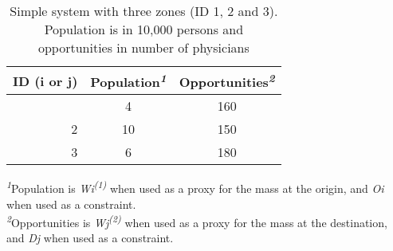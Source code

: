 \begin{table}[!t]
\caption{Simple system with three zones (ID 1, 2 and 3). Population is in 10,000 persons and opportunities in number of physicians} \label{tab:chp2_small_system_land_use_tab}
\fontsize{7.5pt}{9.0pt}\selectfont
\begin{tabular*}{\linewidth}{@{\extracolsep{\fill}}rcc}
\toprule
ID (i or j) & Population\textsuperscript{\textit{1}} & Opportunities\textsuperscript{\textit{2}} \\ 
\midrule\addlinespace[2.5pt]
1 & 4 & 160 \\ 
2 & 10 & 150 \\ 
3 & 6 & 180 \\ 
\bottomrule
\end{tabular*}
\begin{minipage}{\linewidth}
\textsuperscript{\textit{1}}Population is \emph{Wi\textsuperscript{(1)}} when used as a proxy for the mass at the origin, and \emph{Oi} when used as a constraint.\\
\textsuperscript{\textit{2}}Opportunities is \emph{Wj\textsuperscript{(2)}} when used as a proxy for the mass at the destination, and \emph{Dj} when used as a constraint.\\
\end{minipage}
\end{table}

